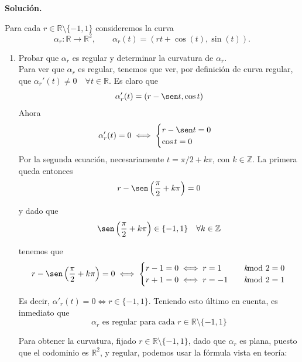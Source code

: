 \documentclass[12pt]{article}
\newcommand{\R}{\mathbb{R}}
\newcommand{\Z}{\mathbb{Z}}
\begin{document}
    \newpage
    \setcounter{ejercicio}{0} %
    \noindent
    \textbf{Solución.}

    \begin{ejercicio}
        Para cada $r \in \mathbb{R}\setminus\{-1,1\}$ consideremos la curva
        $$
        \alpha_r : \mathbb{R}\longrightarrow \mathbb{R}^2,\qquad
        \alpha_r(t) = (rt+\cos(t),\sin(t)).
        $$

        \begin{enumerate}
            \item[a)] Probar que $\alpha_r$ es regular y determinar la curvatura de $\alpha_r$. \\
            
            Para ver que $\alpha_r$ es regular, tenemos que ver, por definición de curva regular, que 
            $\alpha_r'(t) \neq 0 \quad \forall t \in \R$. Es claro que 
            $$\alpha'_r(t) = (r - \sen t, \cos t)$$
            Ahora
            $$\alpha'_r(t) = 0 \iff \begin{cases}
                r - \sen t = 0 \\
                \cos t = 0
            \end{cases}$$
            Por la segunda ecuación, necesariamente $t = \pi/2 + k \pi$, con $k \in \Z$. La primera queda entonces
            $$r - \sen \left( \dfrac{\pi}{2} + k \pi \right) = 0$$

            y dado que $$\sen \left( \dfrac{\pi}{2} + k \pi \right) \in \{-1,1\} \quad \forall k \in \Z$$

            tenemos que 
            $$r - \sen \left( \dfrac{\pi}{2} + k \pi \right) = 0 \iff \begin{cases}
                r - 1 = 0 \iff r = 1 \quad& k \hspace{-0.3cm} \mod 2 = 0 \\
                r + 1 = 0 \iff r = -1 \quad& k \hspace{-0.3cm} \mod 2 = 1
            \end{cases}$$

            Es decir, $\alpha'_r(t) = 0 \iff r \in \{-1,1\}$. Teniendo esto último en cuenta, es inmediato que 
            $$\boxed{\alpha_r \text{ es regular para cada } r \in \R \setminus\{-1,1\}}$$

            Para obtener la curvatura, fijado $r \in \R \setminus \{-1,1\}$, dado que $\alpha_r$ es plana, puesto
            que el codominio es $\R^2$, y regular, podemos usar la fórmula vista en teoría:
            

\end{enumerate}
\end{ejercicio}
\end{document}
